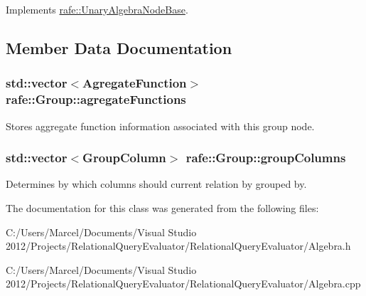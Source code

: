 Implements \hyperlink{classrafe_1_1_unary_algebra_node_base_a6f554aad7250a0f15730d10ae24e4a79}{rafe\+::\+Unary\+Algebra\+Node\+Base}.



\subsection{Member Data Documentation}
\hypertarget{classrafe_1_1_group_a774b152485b449b377745da5967a598d}{
\subsubsection[{agregate\+Functions}]{\setlength{\rightskip}{0pt plus 5cm}std\+::vector$<${\bf Agregate\+Function}$>$ rafe\+::\+Group\+::agregate\+Functions}}\label{classrafe_1_1_group_a774b152485b449b377745da5967a598d}
Stores aggregate function information associated with this group node. \hypertarget{classrafe_1_1_group_a1b65b4d24bf834d05beb6ec00d9ed15b}{
\subsubsection[{group\+Columns}]{\setlength{\rightskip}{0pt plus 5cm}std\+::vector$<${\bf Group\+Column}$>$ rafe\+::\+Group\+::group\+Columns}}\label{classrafe_1_1_group_a1b65b4d24bf834d05beb6ec00d9ed15b}
Determines by which columns should current relation by grouped by. 

The documentation for this class was generated from the following files\+:\begin{DoxyCompactItemize}
\item 
C\+:/\+Users/\+Marcel/\+Documents/\+Visual Studio 2012/\+Projects/\+Relational\+Query\+Evaluator/\+Relational\+Query\+Evaluator/Algebra.\+h\item 
C\+:/\+Users/\+Marcel/\+Documents/\+Visual Studio 2012/\+Projects/\+Relational\+Query\+Evaluator/\+Relational\+Query\+Evaluator/Algebra.\+cpp\end{DoxyCompactItemize}
